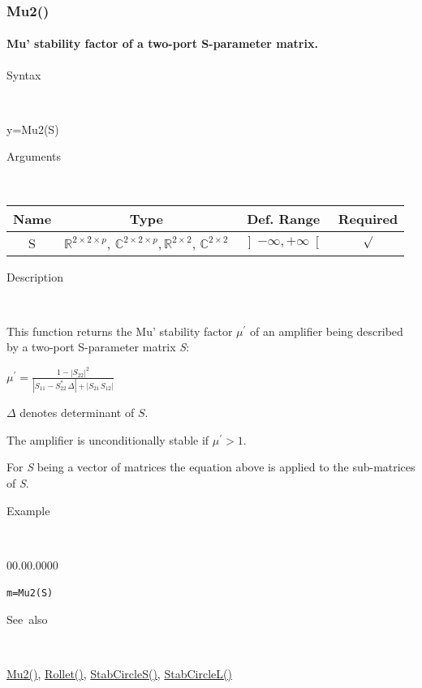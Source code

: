 \newpage
\subsubsection*{\hypertarget{Mu2}{}{\Large Mu2()}}


\paragraph{\label{par:Mu2-stability-factor}Mu' stability factor of a two-port
S-parameter matrix.}

\begin{description}
\item [Syntax]~
\end{description}
y=Mu2(S)

\begin{description}
\item [Arguments]~
\end{description}
\begin{tabular}{|c|c|c|c|}
\hline 
Name&
Type&
Def. Range&
Required\tabularnewline
\hline
\hline 
S&
$\mathbb{R}^{2\times2\times p}$, $\mathbb{C}^{2\times2\times p},$$\mathbb{R}^{2\times2}$,
$\mathbb{C}^{2\times2}$&
$\left]-\infty,+\infty\right[$&
$\surd$\tabularnewline
\hline
\end{tabular}

\begin{description}
\item [Description]~
\end{description}
This function returns the Mu' stability factor $\mu^{\prime}$ of
an amplifier being described by a two-port S-parameter matrix \textit{S}:

\medskip{}
\noindent $\mu^{\prime}={\displaystyle \frac{1-\left|S_{22}\right|^{2}}{\left|S_{11}-S_{22}^{*}\,\Delta\right|+\left|S_{21\,}S_{12}\right|}}$
\medskip{}

$\Delta$ denotes determinant of $S$.

\noindent The amplifier is unconditionally stable if $\mu^{\prime}>1$.

\noindent For \textit{S} being a vector of matrices the equation above
is applied to the sub-matrices of \textit{S}.

\begin{description}
\item [Example]~
\end{description}
\begin{lyxlist}{00.00.0000}
\item [\texttt{m=Mu2(S)}]~
\end{lyxlist}
\begin{description}
\item [See~also]~
\end{description}
\textcolor{blue}{\hyperlink{Mu2}{Mu2()}}\textcolor{black}{,} \textcolor{blue}{\hyperlink{Rollet}{Rollet()}}\textcolor{black}{,}
\textcolor{blue}{\hyperlink{StabCircleS}{StabCircleS()}}\textcolor{black}{,}
\textcolor{blue}{\hyperlink{StabCircleL}{StabCircleL()}}


